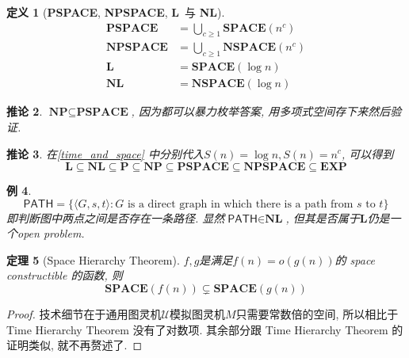 \documentclass[8pt]{article}
\theoremstyle{compact}
\newtheorem{theorem}{定理}[section]
\newtheorem{definition}[theorem]{定义}
\newtheorem{corollary}[theorem]{推论}
\newtheorem{example}[theorem]{例}
\def\ge{\geqslant}
\def\P{\textbf{P}}
\def\NP{\textbf{NP}}
\def\EXP{\textbf{EXP}}
\def\SPACE{\textbf{SPACE}}
\def\NSPACE{\textbf{NSPACE}}
\def\PSPACE{\textbf{PSPACE}}
\def\NPSPACE{\textbf{NPSPACE}}
\def\L{\textbf{L}}
\def\NL{\textbf{NL}}
\begin{document}
\begin{definition}[\PSPACE, \NPSPACE, \L \ 与 \NL]
	\begin{align*}
		\PSPACE &= \bigcup_{c \ge 1}\SPACE(n^c)\\
		\NPSPACE &= \bigcup_{c \ge 1}\NSPACE(n^c)\\
		\L &= \SPACE(\log n)\\
		\NL &= \NSPACE(\log n)
	\end{align*}
\end{definition}
\begin{corollary}
	$\NP \subseteq \PSPACE$, 因为都可以暴力枚举答案, 用多项式空间存下来然后验证. 
\end{corollary}
\begin{corollary}
	在\cref{time_and_space} 中分别代入$S(n) = \log n, S(n) = n^c$, 可以得到
	$$\L \subseteq \NL \subseteq \P \subseteq \NP \subseteq \PSPACE \subseteq \NPSPACE \subseteq \EXP$$
\end{corollary}
\begin{example}
	$$\textsf{PATH} = \{ \langle G, s, t\rangle : G \textrm{ is a direct graph in which there is a path from }s \textrm{ to } t\}$$
	即判断图中两点之间是否存在一条路径. 显然$\textsf{PATH} \in \NL$, 但其是否属于$\L$仍是一个open problem. 
\end{example}
\begin{theorem}[Space Hierarchy Theorem]
	$f, g$是满足$f(n) = o(g(n))$的 space constructible 的函数, 则
	$$\SPACE(f(n)) \subsetneq \SPACE(g(n))$$
\end{theorem}
\begin{proof}
	技术细节在于通用图灵机$\mathcal U$模拟图灵机$M$只需要常数倍的空间, 所以相比于 Time Hierarchy Theorem 没有了对数项. 其余部分跟 Time Hierarchy Theorem 的证明类似, 就不再赘述了. 	
\end{proof}
\end{document}
